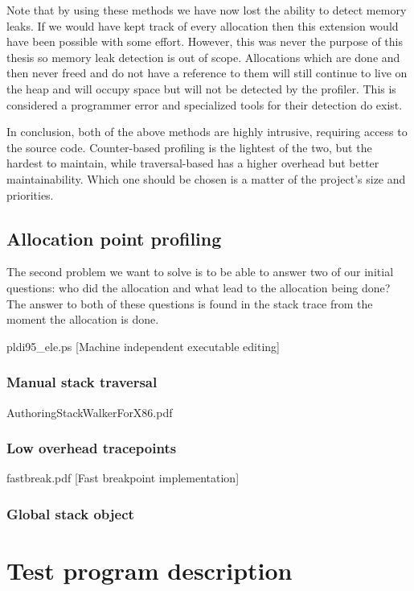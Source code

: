 Note that by using these methods we have now lost the ability to detect memory leaks. If we would have kept track of every allocation then this extension would have been possible with some effort. However, this was never the purpose of this thesis so memory leak detection is out of scope. Allocations which are done and then never freed and do not have a reference to them will still continue to live on the heap and will occupy space but will not be detected by the profiler. This is considered a programmer error and specialized tools for their detection do exist.

In conclusion, both of the above methods are highly intrusive, requiring access to the source code. Counter-based profiling is the lightest of the two, but the hardest to maintain, while traversal-based has a higher overhead but better maintainability. Which one should be chosen is a matter of the project's size and priorities.

\subsection{Allocation point profiling}
\label{subsection:allocationpointprofiling}

The second problem we want to solve is to be able to answer two of our initial questions: who did the allocation and what lead to the allocation being done? The answer to both of these questions is found in the stack trace from the moment the allocation is done.

pldi95\_ele.ps [Machine independent executable editing]

\subsubsection{Manual stack traversal}
\label{subsubsection:manualstacktraversal}

AuthoringStackWalkerForX86.pdf

\subsubsection{Low overhead tracepoints}
\label{subsubsection:lowoverheadtracepoints}

fastbreak.pdf [Fast breakpoint implementation]

\subsubsection{Global stack object}
\label{subsubsection:globalstackobject}

\section{Test program description}
\label{section:testprogram}

